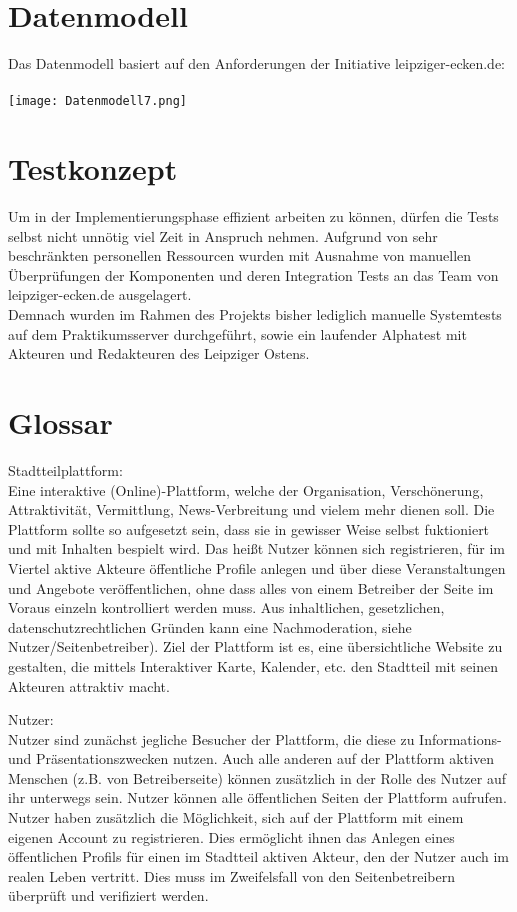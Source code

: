 \documentclass{swp}
\begin{document}
\section{Datenmodell}
Das Datenmodell basiert auf den Anforderungen der Initiative leipziger-ecken.de:\\\\
\texttt{[image: Datenmodell7.png]}
\section{Testkonzept}
Um in der Implementierungsphase effizient arbeiten zu k\"onnen, d\"urfen die Tests selbst nicht unn\"otig viel Zeit in Anspruch nehmen. Aufgrund von sehr beschr\"ankten personellen Ressourcen wurden mit Ausnahme von manuellen \"Uberpr\"ufungen der Komponenten und deren Integration Tests an das Team von leipziger-ecken.de ausgelagert.\\
Demnach wurden im Rahmen des Projekts bisher lediglich manuelle Systemtests auf dem Praktikumsserver durchgef\"uhrt, sowie ein laufender Alphatest mit Akteuren und Redakteuren des Leipziger Ostens.
\section{Glossar}
Stadtteilplattform: \\Eine interaktive (Online)-Plattform, welche der Organisation, Versch\"onerung, Attraktivit\"at, Vermittlung, \glqq News-Verbreitung\grqq{} und vielem mehr dienen soll. Die Plattform sollte so aufgesetzt sein, dass sie in gewisser Weise selbst fuktioniert und mit Inhalten bespielt wird. Das hei{\ss}t Nutzer k\"onnen sich registrieren, f\"ur im Viertel aktive Akteure \"offentliche Profile anlegen und \"uber diese Veranstaltungen und Angebote ver\"offentlichen, ohne dass alles von einem Betreiber der Seite im Voraus einzeln kontrolliert werden muss. Aus inhaltlichen, gesetzlichen, datenschutzrechtlichen Gr\"unden kann eine Nachmoderation, siehe \glqq Nutzer\grqq{}/\glqq Seitenbetreiber\grqq{}). Ziel der Plattform ist es, eine \"ubersichtliche Website zu gestalten, die mittels Interaktiver Karte, Kalender, etc. den Stadtteil mit seinen Akteuren attraktiv macht.

Nutzer:\\Nutzer sind zun\"achst jegliche Besucher der Plattform, die diese zu Informations- und Pr\"asentationszwecken nutzen. Auch alle anderen auf der Plattform aktiven Menschen (z.B. von Betreiberseite) k\"onnen zus\"atzlich in der Rolle des Nutzer auf ihr unterwegs sein. Nutzer k\"onnen alle \"offentlichen Seiten der Plattform aufrufen.\\ 
Nutzer haben zus\"atzlich die M\"oglichkeit, sich auf der Plattform mit einem eigenen Account zu registrieren. Dies erm\"oglicht ihnen das Anlegen eines \"offentlichen Profils f\"ur einen im Stadtteil aktiven Akteur, den der Nutzer auch im realen Leben vertritt. Dies muss im Zweifelsfall von den Seitenbetreibern \"uberpr\"uft und verifiziert werden.
\end{document}

